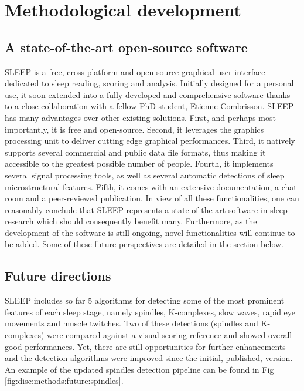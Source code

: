 \cleardoublepage
\chapter{Methodological development}
\label{disc:methods}

\section{A state-of-the-art open-source software}
\label{disc:methods:software}

SLEEP is a free, cross-platform and open-source graphical user interface dedicated to sleep reading, scoring and analysis. Initially designed for a personal use, it soon extended into a fully developed and comprehensive software thanks to a close collaboration with a fellow PhD student, Etienne Combrisson. SLEEP has many advantages over other existing solutions. First, and perhaps most importantly, it is free and open-source. Second, it leverages the graphics processing unit to deliver cutting edge graphical performances. Third, it natively supports several commercial and public data file formats, thus making it accessible to the greatest possible number of people. Fourth, it implements several signal processing tools, as well as several automatic detections of sleep microstructural features. Fifth, it comes with an extensive documentation, a chat room and a peer-reviewed publication. In view of all these functionalities, one can reasonably conclude that SLEEP represents a state-of-the-art software in sleep research which should consequently benefit many. Furthermore, as the development of the software is still ongoing, novel functionalities will continue to be added. Some of these future perspectives are detailed in the section below.

\section{Future directions}
\label{disc:methods:future}

SLEEP includes so far 5 algorithms for detecting some of the most prominent features of each sleep stage, namely spindles, K-complexes, slow waves, rapid eye movements and muscle twitches. Two of these detections (spindles and K-complexes) were compared against a visual scoring reference and showed overall good performances. Yet, there are still opportunities for further enhancements and the detection algorithms were improved since the initial, published, version. An example of the updated spindles detection pipeline can be found in Fig \ref{fig:disc:methods:future:spindles}.

